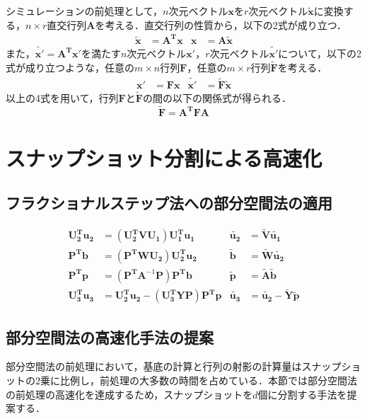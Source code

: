 \documentclass[uplatex,dvipdfmx,10pt,a4paper,notitlepage,oneside,twocolumn]{abst_jsarticle}
\begin{document}
シミュレーションの前処理として，$n$次元ベクトル$\bm{x}$を$r$次元ベクトル$\bm{\tilde{x}} $に変換する，$n \times r$直交行列$\bm{A}$を考える．直交行列の性質から，以下の2式が成り立つ．
 	\begin{align*}
 		\bm{\tilde{x}}  		&= \bm{A^T}\bm{x}		&\bm{x} 			&= \bm{A}\bm{\tilde{x}}
	\end{align*}
	また，$\bm{\tilde{x'}}  = \bm{A^T}\bm{x'}$を満たす$n$次元ベクトル$\bm{x'}$，$r$次元ベクトル$\bm{\tilde{x'}} $について，以下の2式が成り立つような，任意の$m \times n$行列$\bm{F}$，任意の$m \times r$行列$\bm{\tilde{F}}$を考える．
	 \begin{align*}
		\bm{x'} 			&= \bm{F}\bm{x}		&\bm{\tilde{x'}} 		&= \bm{\tilde{F}}\bm{\tilde{x}} 
	\end{align*}
	以上の4式を用いて，行列$\bm{F}$と$\bm{\tilde{F}}$の間の以下の関係式が得られる．
	\[
	\bm{\tilde{F}} = \bm{A^T}\bm{F}\bm{A}
	\]
	
\section{スナップショット分割による高速化}

\subsection{フラクショナルステップ法への部分空間法の適用}
\begin{align*}
 \bm{U_2^T}\bm{u_2}	& = (\bm{U_2^T}\bm{V}\bm{U_1})\bm{U_1^T}\bm{u_1} 					&\bm{\tilde{u_2}} 		&= \bm{\tilde{V}}\bm{\tilde{u_1}}	\\
 \bm{P^T}\bm{b}		& = (\bm{P^T}\bm{W}\bm{U_2})\bm{U_2^T}\bm{u_2}        				&\bm{\tilde{b}}			&= \bm{\tilde{W}}\bm{\tilde{u_2}}	\\
 \bm{P^T}\bm{p} 		&= (\bm{P^T}\bm{A}^{-1}\bm{P})\bm{P^T}\bm{b}						&\bm{\tilde{p}}			&= \bm{\tilde{A}}\bm{\tilde{b}}\\
 \bm{U_3^T}\bm{u_3} 	&=  \bm{U_2^T}\bm{u_2} - (\bm{U_3^T}\bm{Y}\bm{P})\bm{P^T}\bm{p}	&\bm{\tilde{u_3}}		&= \bm{\tilde{u_2}}  -  \bm{\tilde{Y}}\bm{\tilde{p}}
\end{align*}

\subsection{部分空間法の高速化手法の提案}
部分空間法の前処理において，基底の計算と行列の射影の計算量はスナップショットの$2$乗に比例し，前処理の大多数の時間を占めている．本節では部分空間法の前処理の高速化を達成するため，スナップショットを$d$個に分割する手法を提案する．
\end{document}
